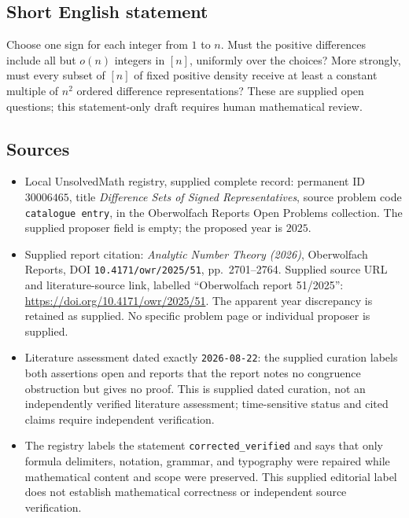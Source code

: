 \documentclass[11pt]{article}
\begin{document}
\subsection{Short English statement}
Choose one sign for each integer from \(1\) to \(n\). Must the positive differences include all but \(o(n)\) integers in \([n]\), uniformly over the choices? More strongly, must every subset of \([n]\) of fixed positive density receive at least a constant multiple of \(n^2\) ordered difference representations? These are supplied open questions; this statement-only draft requires human mathematical review.
\subsection{Sources}
\begin{itemize}
\item Local UnsolvedMath registry, supplied complete record: permanent ID \(30006465\), title \emph{Difference Sets of Signed Representatives}, source problem code \texttt{catalogue entry}, in the Oberwolfach Reports Open Problems collection. The supplied proposer field is empty; the proposed year is \(2025\).
\item Supplied report citation: \emph{Analytic Number Theory (2026)}, Oberwolfach Reports, DOI \texttt{10.4171/owr/2025/51}, pp.\ 2701--2764. Supplied source URL and literature-source link, labelled ``Oberwolfach report 51/2025'': \url{https://doi.org/10.4171/owr/2025/51}. The apparent year discrepancy is retained as supplied. No specific problem page or individual proposer is supplied.
\item Literature assessment dated exactly \texttt{2026-08-22}: the supplied curation labels both assertions open and reports that the report notes no congruence obstruction but gives no proof. This is supplied dated curation, not an independently verified literature assessment; time-sensitive status and cited claims require independent verification.
\item The registry labels the statement \texttt{corrected\_verified} and says that only formula delimiters, notation, grammar, and typography were repaired while mathematical content and scope were preserved. This supplied editorial label does not establish mathematical correctness or independent source verification.
\end{itemize}
\end{document}
